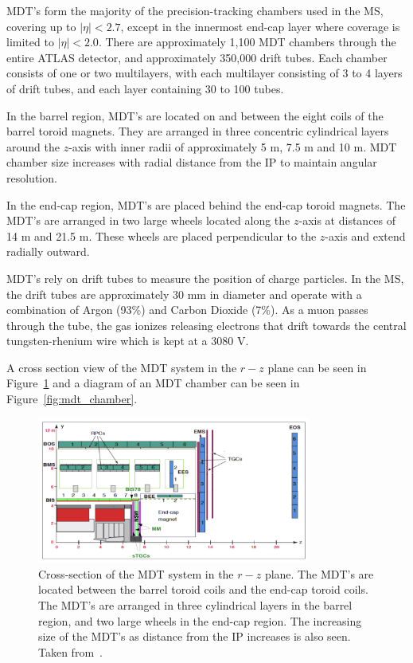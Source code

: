 MDT's form the majority of the precision-tracking chambers used in the MS, covering up to $|\eta| < 2.7$, except in the innermost end-cap layer where coverage is limited to $|\eta| < 2.0$. There are approximately 1,100 MDT chambers through the entire ATLAS detector, and approximately 350,000 drift tubes. Each chamber consists of one or two multilayers, with each multilayer consisting of 3 to 4 layers of drift tubes, and each layer containing 30 to 100 tubes.

In the barrel region, MDT's are located on and between the eight coils of the barrel toroid magnets. They are arranged in three concentric cylindrical layers around the $z$-axis with inner radii of approximately 5 m, 7.5 m and 10 m. MDT chamber size increases with radial distance from the IP to maintain angular resolution\@.

In the end-cap region, MDT's are placed behind the end-cap toroid magnets. The MDT's are arranged in two large wheels located along the $z$-axis at distances of 14 m and 21.5 m. These wheels are placed perpendicular to the $z$-axis and extend radially outward.

MDT's rely on drift tubes to measure the position of charge particles. In the MS, the drift tubes are approximately 30 mm in diameter and operate with a combination of Argon (93\%) and Carbon Dioxide (7\%). As a muon passes through the tube, the gas ionizes releasing electrons that drift towards the central tungsten-rhenium wire which is kept at a 3080 V. 

A cross section view of the MDT system in the $r-z$ plane can be seen in Figure~\ref{fig:atlas_mdt_cross_section} and a diagram of an MDT chamber can be seen in Figure~\ref{fig:mdt_chamber}.

\begin{figure}[htp]
    \centering
    \includegraphics[width=0.8\textwidth]{figures/atlas/atlas_ms_run3_layout.png}
    \caption{Cross-section of the MDT system in the $r-z$ plane. The MDT's are located between the barrel toroid coils and the end-cap toroid coils. The MDT's are arranged in three cylindrical layers in the barrel region, and two large wheels in the end-cap region. The increasing size of the MDT's as distance from the IP increases is also seen. Taken from~\cite{atlas_mdt_cross_section}.}\label{fig:atlas_mdt_cross_section}
\end{figure}

